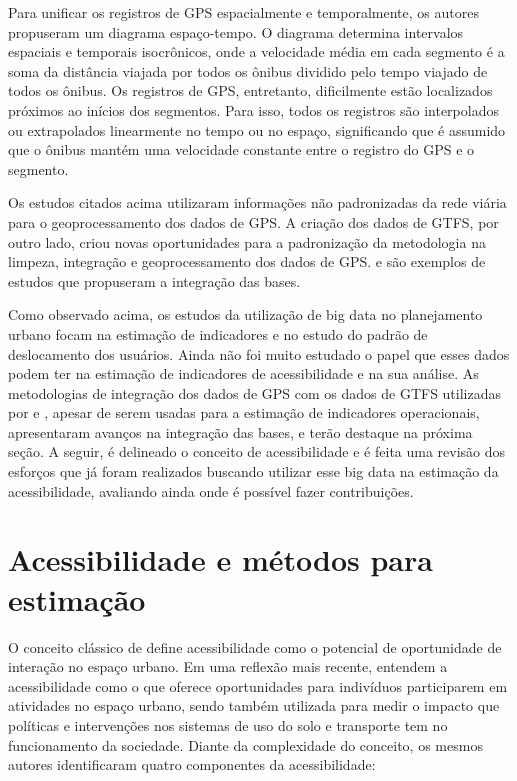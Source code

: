 \documentclass[        
    a4paper,          %
    12pt,             %
    chapter=TITLE,    %
    section=Title,    %
    subsection=Title, %
    oneside,          %
    english,          %
    spanish,          %
    brazil,           %
    fleqn             %
]{abntex2}
\begin{document}
  Para unificar os registros de GPS espacialmente e temporalmente, os autores propuseram um diagrama espaço-tempo. O diagrama determina intervalos espaciais e temporais isocrônicos, onde a velocidade média em cada segmento é a soma da distância viajada por todos os ônibus dividido pelo tempo viajado de todos os ônibus. Os registros de GPS, entretanto, dificilmente estão localizados próximos ao inícios dos segmentos. Para isso, todos os registros são interpolados ou extrapolados linearmente no tempo ou no espaço, significando que é assumido que o ônibus mantém uma velocidade constante entre o registro do GPS e o segmento.
  
  Os estudos citados acima utilizaram informações não padronizadas da rede viária para o geoprocessamento dos dados de GPS. A criação dos dados de GTFS, por outro lado, criou novas oportunidades para a padronização da metodologia na limpeza, integração e geoprocessamento dos dados de GPS. \citet{Arbex2016} e \citet{Rabay2017} são exemplos de estudos que propuseram a integração das bases.
  
  Como observado acima, os estudos da utilização de big data no planejamento urbano focam na estimação de indicadores e no estudo do padrão de deslocamento dos usuários. Ainda não foi muito estudado o papel que esses dados podem ter na estimação de indicadores de acessibilidade e na sua análise. As metodologias de integração dos dados de GPS com os dados de GTFS utilizadas por \citet{Arbex2016} e \citet{Rabay2017}, apesar de serem usadas para a estimação de indicadores operacionais, apresentaram avanços na integração das bases, e terão destaque na próxima seção. A seguir, é delineado o conceito de acessibilidade e é feita uma revisão dos esforços que já foram realizados buscando utilizar esse big data na estimação da acessibilidade, avaliando ainda onde é possível fazer contribuições.
  
  \hypertarget{acessibilidade-e-metodos-para-estimacao}{%
  \section{Acessibilidade e métodos para estimação}\label{acessibilidade-e-metodos-para-estimacao}}
  
  O conceito clássico de \citet{Hansen1959} define acessibilidade como o potencial de oportunidade de interação no espaço urbano. Em uma reflexão mais recente, \citet{Geurs2004} entendem a acessibilidade como o que oferece oportunidades para indivíduos participarem em atividades no espaço urbano, sendo também utilizada para medir o impacto que políticas e intervenções nos sistemas de uso do solo e transporte tem no funcionamento da sociedade. Diante da complexidade do conceito, os mesmos autores identificaram quatro componentes da acessibilidade:
  
\end{document}
